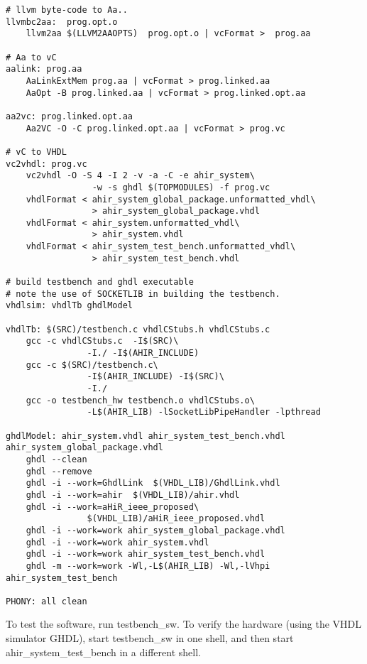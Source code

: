 \documentclass{article}
\begin{document}
\begin{verbatim}
# llvm byte-code to Aa..
llvmbc2aa:  prog.opt.o 
	llvm2aa $(LLVM2AAOPTS)  prog.opt.o | vcFormat >  prog.aa

# Aa to vC
aalink: prog.aa 
	AaLinkExtMem prog.aa | vcFormat > prog.linked.aa
	AaOpt -B prog.linked.aa | vcFormat > prog.linked.opt.aa

aa2vc: prog.linked.opt.aa
	Aa2VC -O -C prog.linked.opt.aa | vcFormat > prog.vc

# vC to VHDL
vc2vhdl: prog.vc
	vc2vhdl -O -S 4 -I 2 -v -a -C -e ahir_system\
                 -w -s ghdl $(TOPMODULES) -f prog.vc 
	vhdlFormat < ahir_system_global_package.unformatted_vhdl\
                 > ahir_system_global_package.vhdl
	vhdlFormat < ahir_system.unformatted_vhdl\
                 > ahir_system.vhdl
	vhdlFormat < ahir_system_test_bench.unformatted_vhdl\
                 > ahir_system_test_bench.vhdl

# build testbench and ghdl executable
# note the use of SOCKETLIB in building the testbench.
vhdlsim: vhdlTb ghdlModel

vhdlTb: $(SRC)/testbench.c vhdlCStubs.h vhdlCStubs.c
	gcc -c vhdlCStubs.c  -I$(SRC)\
                -I./ -I$(AHIR_INCLUDE)
	gcc -c $(SRC)/testbench.c\
                -I$(AHIR_INCLUDE) -I$(SRC)\
                -I./ 
	gcc -o testbench_hw testbench.o vhdlCStubs.o\
                -L$(AHIR_LIB) -lSocketLibPipeHandler -lpthread

ghdlModel: ahir_system.vhdl ahir_system_test_bench.vhdl ahir_system_global_package.vhdl
	ghdl --clean
	ghdl --remove
	ghdl -i --work=GhdlLink  $(VHDL_LIB)/GhdlLink.vhdl
	ghdl -i --work=ahir  $(VHDL_LIB)/ahir.vhdl
	ghdl -i --work=aHiR_ieee_proposed\
                $(VHDL_LIB)/aHiR_ieee_proposed.vhdl
	ghdl -i --work=work ahir_system_global_package.vhdl
	ghdl -i --work=work ahir_system.vhdl
	ghdl -i --work=work ahir_system_test_bench.vhdl
	ghdl -m --work=work -Wl,-L$(AHIR_LIB) -Wl,-lVhpi ahir_system_test_bench 

PHONY: all clean	
\end{verbatim}
To test the software, run testbench\_sw.  To verify the hardware (using
the VHDL simulator GHDL), start testbench\_sw in one shell, and then start ahir\_system\_test\_bench
in a different shell.
\end{document}
